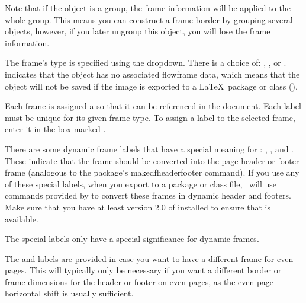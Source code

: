 \begin{information}
Note that if the \gls*{object} is a \gls{group}, the frame
information will be applied to the whole group. This means you can
construct a frame border by grouping several objects, however, if
you later ungroup this \gls*{object}, you will lose the frame
information.
\end{information}


The frame's type is specified using the 
 \gls*{dropdown}. There is a choice of:
, ,
 or .
 indicates that the \gls{object} has
no associated flowframe data, which means that the object will not
be saved if the image is exported to a \LaTeX\ package or
class ().


Each frame is assigned a  so that it can be referenced in the
document. Each label must be unique for its given frame type.  To
assign a label to the selected frame, enter it in the box
marked .

There are some dynamic frame labels that have a special meaning for
\FlowframTk: ,
,
 and
. These indicate that the frame should be converted
into the page header or footer frame (analogous to the
 package's \gls{makedfheaderfooter} command).
If you use any of these special labels, when you export to a package or
class file, \FlowframTk\ will use commands provided by
 to convert these frames in dynamic header and
footers. Make sure that you have at least version 2.0 of
 installed to ensure that  is
available.

\begin{important}
The special labels only have a special significance for dynamic frames.
\end{important}

The  and  labels are provided
in case you want to have a different frame for even pages. This will
typically only be necessary if you want a different border or frame
dimensions for the header or footer on even pages, as the
even page horizontal shift is usually sufficient.

